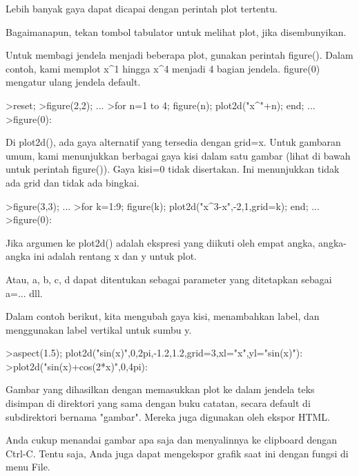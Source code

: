 \documentclass[a4paper,10pt]{article}
\begin{document}
\begin{eulernotebook}
\begin{eulercomment}
\begin{eulercomment}
\begin{eulercomment}
\begin{eulercomment}
\begin{eulercomment}
\begin{eulercomment}
\begin{eulercomment}
Lebih banyak gaya dapat dicapai dengan perintah plot tertentu.

Bagaimanapun, tekan tombol tabulator untuk melihat plot, jika
disembunyikan.

Untuk membagi jendela menjadi beberapa plot, gunakan perintah
figure(). Dalam contoh, kami memplot x\textasciicircum{}1 hingga x\textasciicircum{}4 menjadi 4 bagian
jendela. figure(0) mengatur ulang jendela default.
\end{eulercomment}
\begin{eulerprompt}
>reset;
>figure(2,2); ...
>for n=1 to 4; figure(n); plot2d("x^"+n); end; ...
>figure(0):
\end{eulerprompt}
\begin{eulercomment}
Di plot2d(), ada gaya alternatif yang tersedia dengan grid=x. Untuk
gambaran umum, kami menunjukkan berbagai gaya kisi dalam satu gambar
(lihat di bawah untuk perintah figure()). Gaya kisi=0 tidak
disertakan. Ini menunjukkan tidak ada grid dan tidak ada bingkai.
\end{eulercomment}
\begin{eulerprompt}
>figure(3,3); ...
>for k=1:9; figure(k); plot2d("x^3-x",-2,1,grid=k); end; ...
>figure(0):
\end{eulerprompt}
\begin{eulercomment}
Jika argumen ke plot2d() adalah ekspresi yang diikuti oleh empat
angka, angka-angka ini adalah rentang x dan y untuk plot.

Atau, a, b, c, d dapat ditentukan sebagai parameter yang ditetapkan
sebagai a=... dll.

Dalam contoh berikut, kita mengubah gaya kisi, menambahkan label, dan
menggunakan label vertikal untuk sumbu y.
\end{eulercomment}
\begin{eulerprompt}
>aspect(1.5); plot2d("sin(x)",0,2pi,-1.2,1.2,grid=3,xl="x",yl="sin(x)"):
>plot2d("sin(x)+cos(2*x)",0,4pi):
\end{eulerprompt}
\begin{eulercomment}
Gambar yang dihasilkan dengan memasukkan plot ke dalam jendela teks
disimpan di direktori yang sama dengan buku catatan, secara default di
subdirektori bernama "gambar". Mereka juga digunakan oleh ekspor HTML.

Anda cukup menandai gambar apa saja dan menyalinnya ke clipboard
dengan Ctrl-C. Tentu saja, Anda juga dapat mengekspor grafik saat ini
dengan fungsi di menu File.


\end{eulercomment}
\end{eulercomment}
\end{eulercomment}
\end{eulercomment}
\end{eulercomment}
\end{eulercomment}
\end{eulercomment}
\end{eulernotebook}
\end{document}
